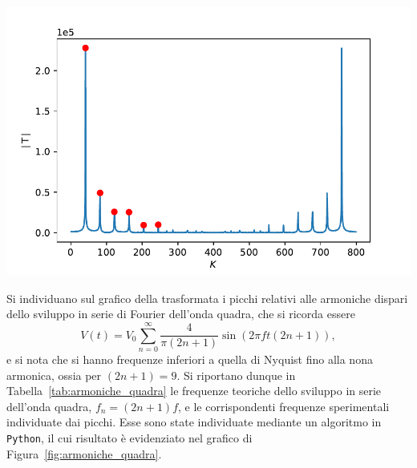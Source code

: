 \documentclass[10pt,oneside,a4paper]{article}
\newenvironment{Figure}
  {\par\medskip\noindent\minipage{\linewidth}}
  {\endminipage\par\medskip}
\begin{document}
\begin{multicols}{2}
\begin{Figure}
	\begin{center}
	\includegraphics[width=\linewidth]{rumore_analisi.pdf}
	\label{fig:armoniche_quadra}
	\end{center}
\end{Figure}

Si individuano sul grafico della trasformata i picchi relativi alle armoniche dispari dello sviluppo in serie di Fourier dell'onda quadra, che si ricorda essere
\[
V(t) = V_0 \sum_{n=0}^{\infty} \frac{4}{\pi(2n+1)} \sin(2\pi f t(2n+1)), 
\]
e si nota che si hanno frequenze inferiori a quella di Nyquist fino alla nona armonica, ossia per $(2n+1) = 9$. Si riportano dunque in Tabella~\ref{tab:armoniche_quadra} le frequenze teoriche dello sviluppo in serie dell'onda quadra, $f_n = (2n+1)f$, e le corrispondenti frequenze sperimentali individuate dai picchi. Esse sono state individuate mediante un algoritmo in \texttt{Python}, il cui risultato è evidenziato nel grafico di Figura~\ref{fig:armoniche_quadra}.





\end{multicols}
\end{document}
